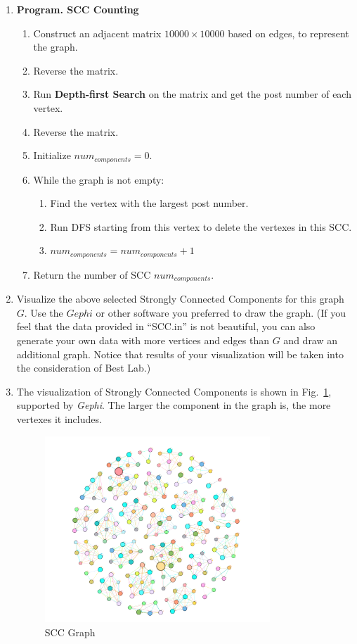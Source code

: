 \documentclass[12pt,a4paper]{article}
\makeatletter
\newtheorem*{solution}{Solution}
\theoremstyle{definition}
\renewenvironment{solution}[1][Solution] {\par\pushQED{\qed}\normalfont\topsep6\p@\@plus6\p@\relax\trivlist\item[\hskip\labelsep\bfseries#1\@addpunct{.}]\ignorespaces}{\popQED\endtrivlist\@endpefalse} \makeatother
\makeatother
\begin{document}
\begin{enumerate}
\begin{enumerate}
\begin{solution}
    	\textbf{Program. SCC Counting}
    	\begin{enumerate}
    	    \item Construct an adjacent matrix $10000\times 10000$ based on edges, to represent the graph.
    	    \item Reverse the matrix.
    	    \item Run \textbf{Depth-first Search} on the matrix and get the post number of each vertex.
    	    \item Reverse the matrix.
    	    \item Initialize $num_{components}=0$.
    	    \item While the graph is not empty:
    	    \begin{enumerate}
    	        \item Find the vertex with the largest post number.
    	        \item Run DFS starting from this vertex to delete the vertexes in this SCC.
    	        \item $num_{components} = num_{components}+1$
    	    \end{enumerate}
    	    \item Return the number of SCC $num_{components}$.
      	\end{enumerate}
    	\end{solution}
    	\item Visualize the above selected Strongly Connected Components for this graph $G$. Use the $Gephi$ or other software you preferred to draw the graph. {\color{blue}(If you feel that the data provided in ``SCC.in'' is not beautiful, you can also generate your own data with more vertices and edges than $G$ and draw an additional graph. Notice that results of your visualization will be taken into the consideration of Best Lab.)}
    	\begin{solution}
    	The visualization of Strongly Connected Components is shown in Fig.~\ref{scc}, supported by \textit{Gephi}. The larger the component in the graph is, the more vertexes it includes.
    	 \begin{figure}[H]
    	    \centering
    	    \includegraphics[width=0.8\textwidth]{graph.png}
    	    \caption{SCC Graph}
    	    \label{scc}
    	\end{figure}
    	\end{solution}
 	

\end{enumerate}
\end{enumerate}
\end{document}
